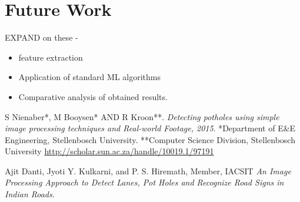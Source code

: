 \documentclass[12pt,a4paper]{article}
\begin{document}
\section{Future Work}
EXPAND on these  - 
\begin{itemize}
\item feature extraction
\item Application of standard ML algorithms
\item Comparative analysis of obtained results.
\end{itemize}


\begin{thebibliography}{9}
S Nienaber*, M Booysen* AND R Kroon**.
\textit{Detecting potholes using simple image processing techniques and Real-world Footage, 2015}. 
*Department of E\&E Engineering, Stellenbosch University.
**Computer Science Division, Stellenbosch University
\url{http://scholar.sun.ac.za/handle/10019.1/97191}
 
Ajit Danti, Jyoti Y. Kulkarni, and P. S. Hiremath, Member, IACSIT
\textit{An Image Processing Approach to Detect Lanes, Pot Holes and Recognize Road Signs in Indian Roads}.

\end{thebibliography}
\end{document}
